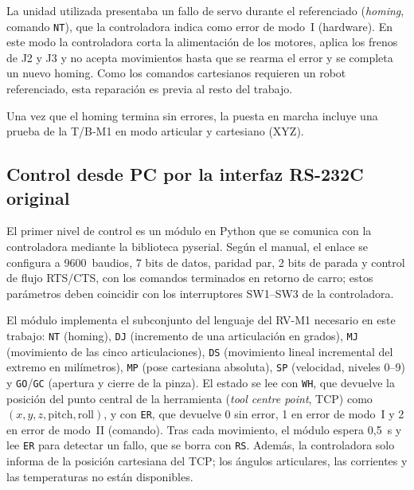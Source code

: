 La unidad utilizada presentaba un fallo de servo durante el referenciado (\textit{homing}, comando \texttt{NT}), que la controladora indica como error de modo~I (hardware). En este modo la controladora corta la alimentación de los motores, aplica los frenos de J2 y J3 y no acepta movimientos hasta que se rearma el error y se completa un nuevo homing. Como los comandos cartesianos requieren un robot referenciado, esta reparación es previa al resto del trabajo. 

Una vez que el homing termina sin errores, la puesta en marcha incluye una prueba de la T/B-M1 en modo articular y cartesiano (XYZ). 

\subsection{Control desde PC por la interfaz RS-232C original}

El primer nivel de control es un módulo en Python que se comunica con la controladora mediante la biblioteca pyserial. Según el manual, el enlace se configura a 9600~baudios, 7 bits de datos, paridad par, 2 bits de parada y control de flujo RTS/CTS, con los comandos terminados en retorno de carro; estos parámetros deben coincidir con los interruptores SW1--SW3 de la controladora. 

El módulo implementa el subconjunto del lenguaje del RV-M1 necesario en este trabajo: \texttt{NT} (homing), \texttt{DJ} (incremento de una articulación en grados), \texttt{MJ} (movimiento de las cinco articulaciones), \texttt{DS} (movimiento lineal incremental del extremo en milímetros), \texttt{MP} (pose cartesiana absoluta), \texttt{SP} (velocidad, niveles 0--9) y \texttt{GO}/\texttt{GC} (apertura y cierre de la pinza). El estado se lee con \texttt{WH}, que devuelve la posición del punto central de la herramienta (\textit{tool centre point}, TCP) como $(x, y, z, \text{pitch}, \text{roll})$, y con \texttt{ER}, que devuelve 0 sin error, 1 en error de modo~I y 2 en error de modo~II (comando). Tras cada movimiento, el módulo espera 0,5~s y lee \texttt{ER} para detectar un fallo, que se borra con \texttt{RS}. Además, la controladora solo informa de la posición cartesiana del TCP; los ángulos articulares, las corrientes y las temperaturas no están disponibles. 

